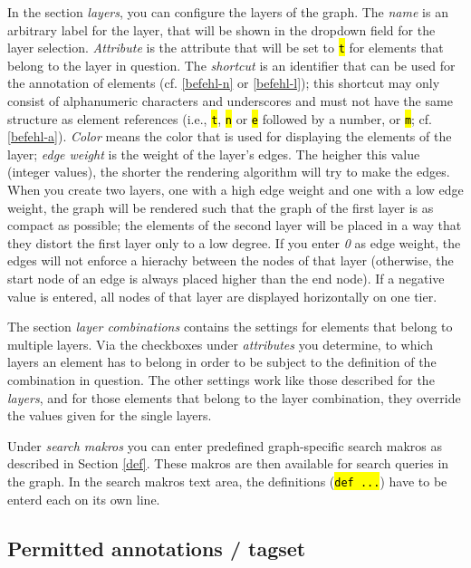 \documentclass[12pt]{scrartcl}
\newcommand{\code}[1]{\hl{\texttt{#1}}}
\begin{document}
In the section \textit{layers}, you can configure the layers of the graph.
The \textit{name} is an arbitrary label for the layer, that will be shown in the dropdown field for the layer selection.
\textit{Attribute} is the attribute that will be set to \code{t} for elements that belong to the layer in question.
The \textit{shortcut} is an identifier that can be used for the annotation of elements (cf. \ref{befehl-n} or \ref{befehl-l}); this shortcut may only consist of alphanumeric characters and underscores and must not have the same structure as element references (i.e., \code{t}, \code{n} or \code{e} followed by a number, or  \code{m}; cf. \ref{befehl-a}).
\textit{Color} means the color that is used for displaying the elements of the layer; \textit{edge weight} is the weight of the layer’s edges.
The heigher this value (integer values), the shorter the rendering algorithm will try to make the edges.
When you create two layers, one with a high edge weight and one with a low edge weight, the graph will be rendered such that the graph of the first layer is as compact as possible; the elements of the second layer will be placed in a way that they distort the first layer only to a low degree.
If you enter \textit{0} as edge weight, the edges will not enforce a hierachy between the nodes of that layer (otherwise, the start node of an edge is always placed higher than the end node).
If a negative value is entered, all nodes of that layer are displayed horizontally on one tier.

The section \textit{layer combinations} contains the settings for elements that belong to multiple layers.
Via the checkboxes under \textit{attributes} you determine, to which layers an element has to belong in order to be subject to the definition of the combination in question.
The other settings work like those described for the \textit{layers}, and for those elements that belong to the layer combination, they override the values given for the single layers.

Under \textit{search makros} you can enter predefined graph-specific search makros as described in Section \ref{def}.
These makros are then available for search queries in the graph.
In the search makros text area, the definitions (\code{def ...}) have to be enterd each on its own line.

\subsection{Permitted annotations / tagset}\label{erlaubteannotationen}
\end{document}

